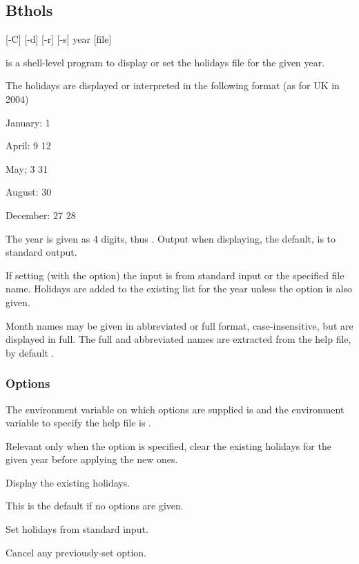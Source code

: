 \subsection{Bthols}

\begin{expara}

\BtholsName{} [-C] [-d] [-r] [-s] year [file]

\end{expara}

\PrBthols{} is a shell-level program to display or set the holidays file for the given year.

The holidays are displayed or interpreted in the following format (as for UK in 2004)

\begin{expara}

January: 1

April: 9 12

May; 3 31

August: 30

December: 27 28

\end{expara}

The year is given as 4 digits, thus . Output when displaying, the
default, is to standard output.

If setting (with the  option) the input is from standard input or the specified file name. Holidays are added to
the existing list for the year unless the  option is also given.

Month names may be given in abbreviated or full format, case-insensitive, but are displayed in full. The full and abbreviated
names are extracted from the help file, by default .

\subsubsection{Options}
The environment variable on which options are supplied is \filename{\BtholsVarname} and the environment variable to specify the
help file is .

\explainopt


Relevant only when the  option is specified, clear the existing holidays for the given year before
applying the new ones.


Display the existing holidays.

This is the default if no options are given.


Set holidays from standard input.


Cancel any previously-set  option.


